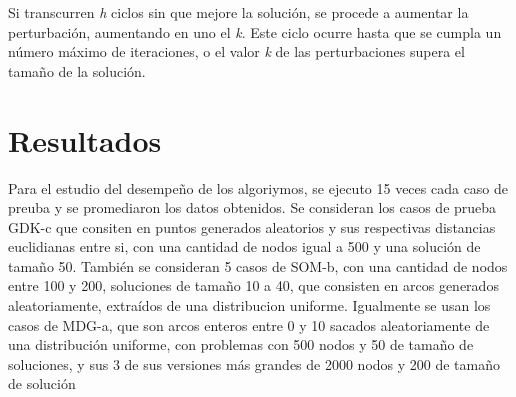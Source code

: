 \documentclass{ci5652}
\begin{document}
Si transcurren \textit{h} ciclos sin que mejore la solución, se procede a aumentar la perturbación, aumentando en uno el \textit{k}. Este ciclo ocurre hasta que se cumpla un número máximo de iteraciones, o el valor \textit{k} de las perturbaciones supera el tamaño de la solución.

%
%

\section{Resultados}
Para el estudio del desempeño de los algoriymos, se ejecuto 15 veces cada caso de preuba y se promediaron
los datos obtenidos. Se consideran los casos de prueba GDK-c que consiten en puntos generados aleatorios y
sus respectivas distancias euclidianas entre si, con una cantidad de nodos igual a 500 y una solución de tamaño 50.
También se consideran 5 casos de SOM-b, con una cantidad de nodos entre 100 y 200, soluciones de tamaño 10 a 40, que consisten
en arcos generados aleatoriamente, extraídos de una distribucion uniforme. Igualmente se usan los casos de MDG-a, que
son arcos enteros entre 0 y 10 sacados aleatoriamente de una distribución uniforme, con problemas con 500 nodos y 50 de tamaño de soluciones, y sus 3 de sus versiones más grandes de 2000 nodos y 200 de tamaño de solución
\end{document}
